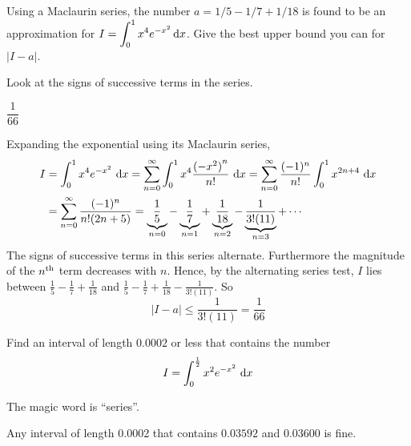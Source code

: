 \begin{question}[2012A]
Using a Maclaurin series, the number $a = 1/5-1/7+1/18$ is found to be an approximation for $\displaystyle I = \int_0^1 x^4 e^{-x^2}\,\mathrm{d}x$. Give the best
upper bound you can for $|I - a|$.
\end{question}

\begin{hint}
Look at the signs of successive terms in the series.
\end{hint}

\begin{answer}
$\dfrac{1}{66}$
\end{answer}

\begin{solution}
Expanding the exponential using its Maclaurin series,
\begin{align*}
I&=\int_0^1 x^4 e^{-x^2}\ \mathrm{d}x
=\sum_{n=0}^\infty\int_0^1 x^4 \frac{{(-x^2)}^n}{n!}\ \mathrm{d}x
=\sum_{n=0}^\infty \frac{(-1)^n}{n!}\int_0^1 x^{2n+4} \ \mathrm{d}x \\
&=\sum_{n=0}^\infty \frac{(-1)^n}{n!(2n+5)}
= \underbrace{\frac{1}{5}}_{n=0}
   -\underbrace{\frac{1}{7}}_{n=1}
   +\underbrace{\frac{1}{18}}_{n=2}
   -\underbrace{\frac{1}{3!(11)}}_{n=3}
   +\cdots
\end{align*}
The signs of successive terms in this series alternate. Furthermore the
magnitude of the $n^{\rm th}$ term decreases with $n$. Hence, by the alternating
series test, $I$ lies between
$\frac{1}{5}-\frac{1}{7}+\frac{1}{18}$ and
$\frac{1}{5}-\frac{1}{7}+\frac{1}{18}-\frac{1}{3!(11)}$.
So
\begin{equation*}
|I - a| \le \frac{1}{3!(11)} =\frac{1}{66}
\end{equation*}

\end{solution}



\begin{question}[M121 1999A]
Find an interval of length $0.0002$ or less that contains
the number
\begin{equation*}
I=\int_0^{\frac{1}{2}} x^2 e^{-x^2}\ \dee{x}
\end{equation*}
\end{question}

\begin{hint}
The magic word is ``series''.
\end{hint}

\begin{answer}
Any interval of length 0.0002 that contains $0.03592$ and $0.03600$
is fine.
\end{answer}

